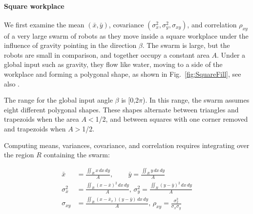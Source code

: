 \paragraph{Square workplace}
We first examine the mean $(\bar{x},\bar{y})$, covariance $(\sigma^2_x,\sigma^2_y,\sigma_{xy})$, and correlation $\rho_{xy}$ of a very large swarm of robots as they move inside a square workplace under the influence of gravity pointing in the direction $\beta$. The swarm is large, but the robots are small in comparison, and together occupy a constant area $A$. Under a global input such as gravity, they flow like water, moving to a side of the workplace and forming a polygonal shape, as shown in Fig.~\ref{fig:SquareFill},  see also \citep{Zhao2016mathematicaSquare}.

The range for the global input angle $\beta $ is [0,2$\pi $). In this range, the swarm assumes eight different polygonal shapes. 
These shapes alternate between triangles and trapezoids when the area $A$$<$1/2, and between squares with one corner removed and trapezoids when $A$$>$1/2.

Computing means, variances, covariance, and correlation requires integrating over the region $R$ containing the swarm:  %

\begin{align}
\bar{x} &=\frac{\iint_R x \,dx\,dy}{A} \label{eq:meanInSquareWorkspace}
\text{, }\qquad \bar{y}=\frac{\iint_R y \,dx\,dy}{A} \\
\sigma^2_x &=\frac{\iint_R \left(x-\bar{x}\right)^2  \,dx \,dy}{A}  \label{eq:varInSquareWorkspace}
\text{, } \sigma^2_y =\frac{\iint_R  \left(y-\bar{y}\right)^2 \,dx \,dy}{A}\\
\sigma_{xy} &= \frac{\iint_R  \left(x-\bar{x}_x\right) \left(y-\bar{y}\right) \, dx \,dy}{A} \label{eq:covAndcorrInSquareWorkspace}
\text{, }\rho_{xy} = \frac{\sigma^2_x}{\sigma_x\sigma_y}
\end{align}

